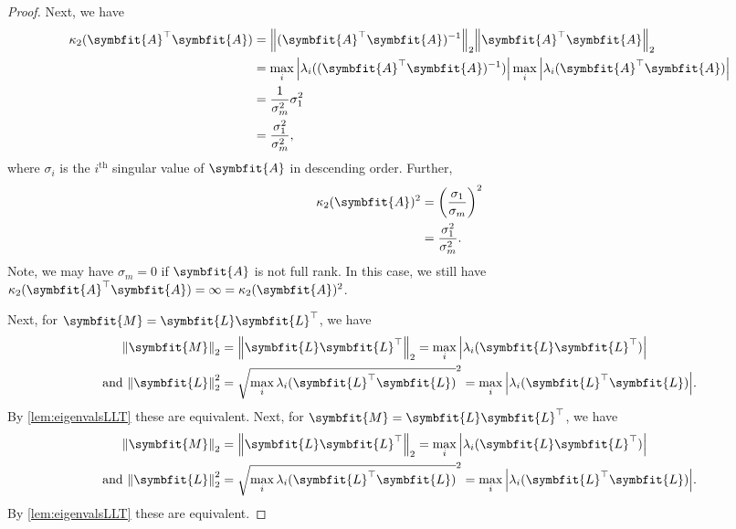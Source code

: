 \documentclass{article}
\theoremstyle{definition}
\newcommand{\mat}[1]{\symbfit{#1}}
\begin{document}
\begin{enumerate}[leftmargin=\labelsep]
\begin{proof}
		      Next, we have
		      \begin{align*}
			      \kappa_2(\mat{A}^\top \mat{A}) & = \norm{(\mat{A}^\top \mat{A})^{-1}}_2 \norm{\mat{A}^\top \mat{A}}_2                                   \\
			                                     & = \max_i \abs{ \lambda_i((\mat{A}^\top \mat{A})^{-1} )} \max_i \abs{ \lambda_i(\mat{A}^\top \mat{A}) } \\
			                                     & = \frac{1}{\sigma_m^2} \sigma_1^2                                                                      \\
			                                     & = \frac{\sigma_1^2}{\sigma_m^2},
		      \end{align*}
		      where \(\sigma_i\) is the \(i^{\text{th}}\) singular value of \(\mat{A}\) in descending order. Further,
		      \begin{align*}
			      \kappa_2(\mat{A})^2 & = \qty(\frac{\sigma_1}{\sigma_m})^2 \\
			                          & = \frac{\sigma_1^2}{\sigma_m^2}.
		      \end{align*}
		      Note, we may have \(\sigma_m=0\) if \(\mat{A}\) is not full rank. In this case, we still have \(\kappa_2(\mat{A}^\top \mat{A})=\infty=\kappa_2(\mat{A})^2\).

		      Next, for \(\mat{M} = \mat{L}\mat{L}^\top\), we have
		      \begin{align*}
			      \norm{\mat{M}}_2              & = \norm{\mat{L}\mat{L}^\top}_2 = \max_i \abs{ \lambda_i(\mat{L}\mat{L}^\top) }                   \\
			      \text{and }\norm{\mat{L}}_2^2 & = \sqrt{\max_i\lambda_i(\mat{L}^\top\mat{L})}^2 = \max_i \abs{ \lambda_i(\mat{L}^\top\mat{L}) }.
		      \end{align*}
		      By \cref{lem:eigenvalsLLT} these are equivalent.
		      Next, for \(\mat{M} = \mat{L}\mat{L}^\top\), we have
		      \begin{align*}
			      \norm{\mat{M}}_2              & = \norm{\mat{L}\mat{L}^\top}_2 = \max_i \abs{ \lambda_i(\mat{L}\mat{L}^\top) }                   \\
			      \text{and }\norm{\mat{L}}_2^2 & = \sqrt{\max_i\lambda_i(\mat{L}^\top\mat{L})}^2 = \max_i \abs{ \lambda_i(\mat{L}^\top\mat{L}) }.
		      \end{align*}
		      By \cref{lem:eigenvalsLLT} these are equivalent.


\end{proof}
\end{enumerate}
\end{document}
